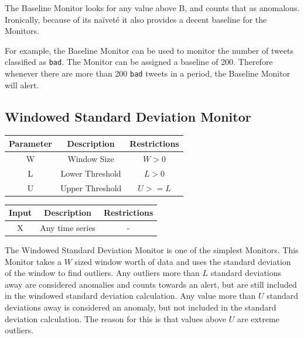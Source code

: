 \documentclass[12pt]{ucthesis}
\begin{document}
The Baseline Monitor looks for any value above B, and counts that as anomalous.
Ironically, because of its na\"{i}vet\'{e} it also provides a decent baseline for the Monitors.

For example, the Baseline Monitor can be used to monitor the number of tweets classified as \texttt{bad}.
The Monitor can be assigned a baseline of 200.
Therefore whenever there are more than 200 \texttt{bad} tweets in a period, the Baseline Monitor will alert.

\subsection{Windowed Standard Deviation Monitor}
\label{outage-detection-monitors-WindowStdDev}
\begin{table}[H]
   \begin{center}
      \begin{tabular}{|c|c|c|}
         \hline
            Parameter & Description & Restrictions \\
         \hline
            W & Window Size & $ W > 0 $\\
         \hline
            L & Lower Threshold & $L > 0 $\\
         \hline
            U & Upper Threshold & $U >= L $\\
         \hline
      \end{tabular}
   \end{center}
\end{table}

\begin{table}[H]
   \begin{center}
      \begin{tabular}{|c|c|c|}
         \hline
            Input & Description & Restrictions \\
         \hline
            X & Any time series & - \\
         \hline
      \end{tabular}
   \end{center}
\end{table}

The Windowed Standard Deviation Monitor is one of the simplest Monitors. This Monitor takes a $W$ sized window worth of data
and uses the standard deviation of the window to find outliers. Any outliers more than $L$ standard deviations away are considered anomalies and counts towards
an alert, but are still included in the windowed standard deviation calculation. Any value more than $U$ standard deviations away is considered an anomaly, but not included
in the standard deviation calculation. The reason for this is that values above $U$ are extreme outliers.
\end{document}
